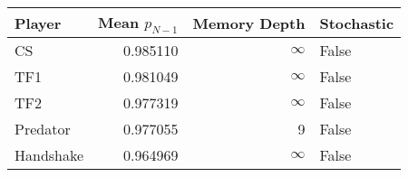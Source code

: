 \begin{tabular}{lrrl}
\toprule
    Player &  Mean $p_{N-1}$ &  Memory Depth & Stochastic \\
\midrule
        CS &        0.985110 &            \(\infty\) &      False \\
       TF1 &        0.981049 &            \(\infty\) &      False \\
       TF2 &        0.977319 &            \(\infty\) &      False \\
  Predator &        0.977055 &             9 &      False \\
 Handshake &        0.964969 &            \(\infty\) &      False \\
\bottomrule
\end{tabular}
